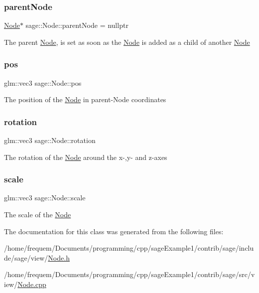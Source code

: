 \subsubsection{\texorpdfstring{parentNode}{parentNode}}
{\footnotesize\ttfamily \mbox{\hyperlink{classsage_1_1Node}{Node}}$\ast$ sage\+::\+Node\+::parent\+Node = nullptr\hspace{0.3cm}{\ttfamily [protected]}}

The parent \mbox{\hyperlink{classsage_1_1Node}{Node}}, is set as soon as the \mbox{\hyperlink{classsage_1_1Node}{Node}} is added as a child of another \mbox{\hyperlink{classsage_1_1Node}{Node}} \mbox{\label{classsage_1_1Node_a26c32e5ec11e0ed7f33053ecac6830d5}} 
\subsubsection{\texorpdfstring{pos}{pos}}
{\footnotesize\ttfamily glm\+::vec3 sage\+::\+Node\+::pos\hspace{0.3cm}{\ttfamily [protected]}}

The position of the \mbox{\hyperlink{classsage_1_1Node}{Node}} in parent-\/\+Node coordinates \mbox{\label{classsage_1_1Node_a7f338279775e186e48336145a5d69241}} 
\subsubsection{\texorpdfstring{rotation}{rotation}}
{\footnotesize\ttfamily glm\+::vec3 sage\+::\+Node\+::rotation\hspace{0.3cm}{\ttfamily [protected]}}

The rotation of the \mbox{\hyperlink{classsage_1_1Node}{Node}} around the x-\/,y-\/ and z-\/axes \mbox{\label{classsage_1_1Node_a686c3edeea1faab8b566bfdf2fe3f906}} 
\subsubsection{\texorpdfstring{scale}{scale}}
{\footnotesize\ttfamily glm\+::vec3 sage\+::\+Node\+::scale\hspace{0.3cm}{\ttfamily [protected]}}

The scale of the \mbox{\hyperlink{classsage_1_1Node}{Node}} 

The documentation for this class was generated from the following files\+:\begin{DoxyCompactItemize}
\item 
/home/frequem/\+Documents/programming/cpp/sage\+Example1/contrib/sage/include/sage/view/\mbox{\hyperlink{Node_8h}{Node.\+h}}\item 
/home/frequem/\+Documents/programming/cpp/sage\+Example1/contrib/sage/src/view/\mbox{\hyperlink{Node_8cpp}{Node.\+cpp}}\end{DoxyCompactItemize}
